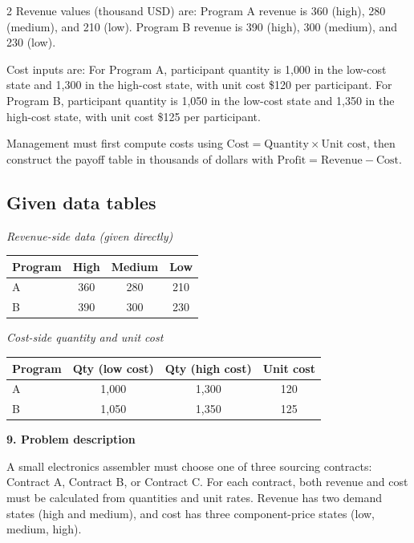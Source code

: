 \documentclass[12pt]{article}
\newcommand{\SubsectionBox}[1]{%
	\noindent\colorbox{gray!30}{%
		\parbox{\linewidth}{\textbf{#1}}%
	}\par\vspace{0.35cm}%
}
\begin{document}
\begin{multicols}{2}
				Revenue values (thousand USD) are:
				Program A revenue is 360 (high), 280 (medium), and 210 (low).
				Program B revenue is 390 (high), 300 (medium), and 230 (low).
				
				Cost inputs are:
				For Program A, participant quantity is 1{,}000 in the low-cost state and 1{,}300 in the high-cost state, with unit cost \$120 per participant.
				For Program B, participant quantity is 1{,}050 in the low-cost state and 1{,}350 in the high-cost state, with unit cost \$125 per participant.
				
				Management must first compute costs using
				\(\text{Cost}=\text{Quantity}\times\text{Unit cost}\), then construct the payoff table in thousands of dollars with
				\(\text{Profit}=\text{Revenue}-\text{Cost}\).
				\subsection*{Given data tables}
				\begin{center}
					\textit{Revenue-side data (given directly)}
					\begin{center}
						\begin{tabular}{l c c c}
							\toprule
							Program & High & Medium & Low \\
							\midrule
							A & 360 & 280 & 210 \\
							B & 390 & 300 & 230 \\
							\bottomrule
						\end{tabular}
					\end{center}
					
					\vspace{0.5cm}
					
					\textit{Cost-side quantity and unit cost}
					\begin{center}
						\begin{tabular}{l c c c}
							\toprule
							Program & Qty (low cost) & Qty (high cost) & Unit cost \\
							\midrule
							A & 1{,}000 & 1{,}300 & 120 \\
							B & 1{,}050 & 1{,}350 & 125 \\
							\bottomrule
						\end{tabular}
					\end{center}
				\end{center}
				
		\vspace{0.25cm}
		\SubsectionBox{9. Problem description}\vspace{-0.25cm}
		A small electronics assembler must choose one of three sourcing contracts: Contract A, Contract B, or Contract C.
				For each contract, both revenue and cost must be calculated from quantities and unit rates.
				Revenue has two demand states (high and medium), and cost has three component-price states (low, medium, high).
				

\end{multicols}
\end{document}
